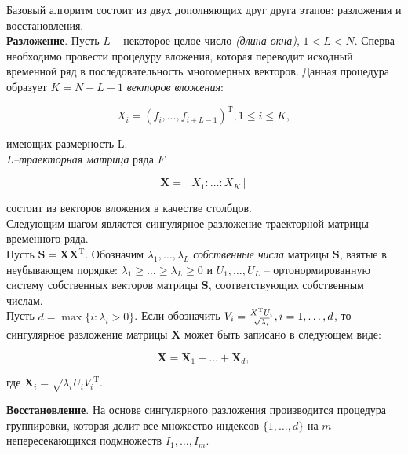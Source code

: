 \documentclass[specialist,
			   substylefile = spbu_report.rtx,
			   subf,href,colorlinks=true, 12pt]{disser}
\begin{document}
Базовый алгоритм состоит из двух дополняющих друг друга этапов: разложения и восстановления.\\



\textbf{Разложение}. Пусть $L$ – некоторое целое число \textit{(длина окна)}, $1 < L < N$. Сперва необходимо провести процедуру вложения, которая переводит исходный временной ряд в последовательность многомерных векторов. Данная процедура образует $K = N - L + 1$ \textit{векторов вложения}:

\begin{equation*}
	X_i = (f_{i}, \dots, f_{i + L - 1})^\mathrm{T}, 1 \leq i \leq K,
\end{equation*}

имеющих размерность L. \\

\textit{L–траекторная матрица} ряда $F$:

\begin{equation*}
	\mathbf{X} = [X_1: \dots: X_K]
\end{equation*}

состоит из векторов вложения в качестве столбцов.\\

Следующим шагом является сингулярное разложение траекторной матрицы временного ряда.\\

Пусть $\mathbf{S} = \mathbf{XX}^\mathrm{T}$. Обозначим $\lambda_1, \dots, \lambda_L$ \textit{собственные числа} матрицы $\mathbf{S}$, взятые в неубывающем порядке: $\lambda_1 \geq \dots \geq \lambda_L \geq 0$ и $U_1, \dots, U_L$ – ортонормированную систему собственных векторов матрицы $\mathbf{S}$, соответствующих собственным числам.\\

Пусть $d = \max\{i: \lambda_i > 0\}$. Если обозначить $V_i = {X^\mathrm{T} U_i \over \sqrt{\lambda_i}}, i = 1, \dots, d$, то сингулярное разложение матрицы $\mathbf{X}$ может быть записано в следующем виде:

\begin{equation*}
	\mathbf{X} = \mathbf{X}_1 + \dots + \mathbf{X}_d,
\end{equation*}

где $\mathbf{X}_i = \sqrt{\lambda_i} U_i {V_i}^\mathrm{T}$.



\textbf{Восстановление}. На основе сингулярного разложения производится процедура группировки, которая делит все множество индексов $\{1, \dots, d\}$ на $m$ непересекающихся подмножеств $I_1, \dots, I_m$.\\
\end{document}
